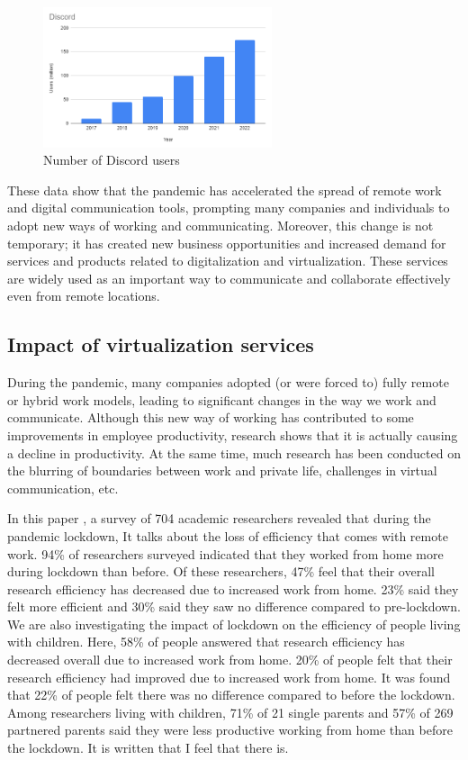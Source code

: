 \documentclass[12pt]{article}
\begin{document}
\begin{figure}[H]
    \centering
    \includegraphics[width=0.6\textwidth]{discord.png}
    \caption{Number of Discord users}
    \label{fig:my_label}
\end{figure}

These data show that the pandemic has accelerated the spread of remote work and
digital communication tools, prompting many companies and individuals to adopt
new ways of working and communicating. Moreover, this change is not temporary;
it has created new business opportunities and increased demand for services and
products related to digitalization and virtualization. These services are
widely used as an important way to communicate and collaborate effectively even
from remote locations.

\subsection{Impact of virtualization services}
During the pandemic, many companies adopted (or were forced to) fully remote or
hybrid work models, leading to significant changes in the way we work and
communicate. Although this new way of working has contributed to some
improvements in employee productivity, research shows that it is actually
causing a decline in productivity. At the same time, much research has been
conducted on the blurring of boundaries between work and private life,
challenges in virtual communication, etc.

In this paper \cite{10.1371/journal.pone.0249127}, a survey of 704 academic
researchers revealed that
during the pandemic lockdown,
It talks about the loss of efficiency that comes with remote work. 94\% of
researchers surveyed indicated that they worked from home more during lockdown
than before. Of these researchers, 47\% feel that their overall research
efficiency has decreased due to increased work from home. 23\% said they felt
more efficient and 30\% said they saw no difference compared to pre-lockdown.
We are also investigating the impact of lockdown on the efficiency of people
living with children. Here, 58\% of people answered that research efficiency
has decreased overall due to increased work from home. 20\% of people felt that
their research efficiency had improved due to increased work from home. It was
found that 22\% of people felt there was no difference compared to before the
lockdown. Among researchers living with children, 71\% of 21 single parents and
57\% of 269 partnered parents said they were less productive working from home
than before the lockdown. It is written that I feel that there is.
\end{document}

